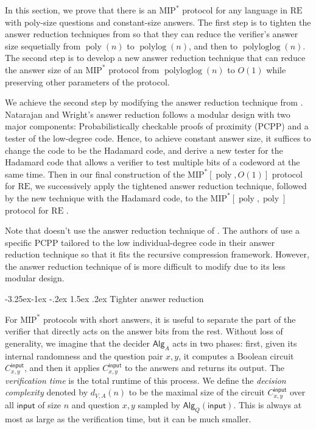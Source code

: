 \documentclass[10pt,a4paper]{article}
\makeatletter
\renewcommand{\subsection}{\@startsection{subsection}{2}{\z@}%
             {-3.25ex\@plus -1ex \@minus -.2ex}%
             {1.5ex \@plus .2ex}%
             {\normalfont\large\scshape\bfseries}}
\theoremstyle{plain}
\theoremstyle{definition}
\newcommand{\poly} {\ensuremath{\operatorname{poly}}}
\newcommand{\polylog} {\ensuremath{\operatorname{polylog}}}
\newcommand{\polyloglog} {\ensuremath{\operatorname{polyloglog}}}
\newcommand{\1}{\mathbb{1}} %
\newcommand{\PCPP}{\mathrm{PCPP}}
\newcommand{\ipt}{\mathsf{input}}
\newcommand{\Alg}{\mathsf{Alg}}
\newcommand{\MIP}{\mathrm{MIP}}
\newcommand{\RE}{\mathrm{RE}}
\makeatother
\begin{document}
In this section, we prove that there is an $\MIP^\ast$ protocol for any language in $\RE$ with poly-size questions and constant-size answers.
The first step is to tighten the answer reduction techniques from \cite{JNVWY'20,10.1145/3564246.3585208} so that they can reduce the verifier's answer size sequetially from $\poly(n)$ to $\polylog(n)$, and then to $\polyloglog(n)$. 
The second step is to develop a new answer reduction technique that can reduce the answer size of an $\MIP^\ast$ protocol from $\polyloglog(n)$ to $O(1)$ while preserving other parameters of the protocol.

We achieve the second step by modifying the answer reduction technique from \cite{neexp}.
Natarajan and Wright's answer reduction follows a modular design with two major components: Probabilistically checkable proofs of proximity ($\PCPP$) and a tester of the low-degree code.
Hence, to achieve constant answer size, it suffices to change the code to be the Hadamard code, and derive a new tester for the Hadamard code
that allows a verifier to test multiple bits of a codeword at the same time.
Then in our final construction of the $\MIP^\ast[\poly, O(1)]$ protocol for $\RE$, we successively apply the tightened answer reduction technique, followed by the new technique with the Hadamard code, to the $\MIP^\ast[\poly, \poly]$ protocol for $\RE$ \cite{JNVWY'20}. 

Note that \cite{JNVWY'20} doesn't use the answer reduction technique of \cite{neexp}. 
The authors of \cite{JNVWY'20} use a specific $\PCPP$ tailored to the low individual-degree code in their answer reduction technique so that it fits the recursive compression framework.
However, the answer reduction technique of \cite{JNVWY'20} is more difficult to modify due to its less modular design.


\subsection{Tighter answer reduction}

For $\MIP^*$ protocols with short answers, it is useful to separate the part of the verifier that directly acts on the answer bits from the rest. Without loss of generality, we imagine that the decider $\Alg_A$ acts in two phases: first, given its internal randomness and the question pair $x,y$, it computes a Boolean circuit $C^{\ipt}_{x,y} $, and then it applies $C^{\ipt}_{x,y}$ to the answers and returns its output. The \emph{verification time} is the total runtime of this process. We define the \emph{decision complexity} denoted by $d_{V,A}(n)$ to be the maximal size of the circuit $C^{\ipt}_{x,y}$ over all $\ipt$ of size $n$ and question $x,y$ sampled by $\Alg_Q(\ipt)$.
This is always at most as large as the verification time, but it can be much smaller. 
\end{document}

